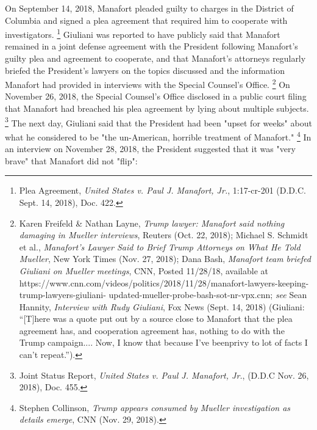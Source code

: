 On September 14, 2018, Manafort pleaded guilty to charges in the District of Columbia and signed a plea agreement that required him to cooperate with investigators.%
\footnote{Plea Agreement, \textit{United States v. Paul J. Manafort, Jr.}, 1:17-cr-201 (D.D.C. Sept. 14, 2018), Doc. 422.}
Giuliani was reported to have publicly said that Manafort remained in a joint defense agreement with the President following Manafort's guilty plea and agreement to cooperate, and that Manafort's attorneys regularly briefed the President's lawyers on the topics discussed and the information Manafort had provided in interviews with the Special Counsel's Office.%
\footnote{Karen Freifeld \& Nathan Layne, \textit{Trump lawyer: Manafort said nothing damaging in Mueller interviews}, Reuters (Oct. 22, 2018);
Michael S. Schmidt et al., \textit{Manafort’s Lawyer Said to Brief Trump Attorneys on What He Told Mueller}, New York Times (Nov. 27, 2018);
Dana Bash, \textit{Manafort team briefed Giuliani on Mueller meetings}, CNN, Posted 11/28/18, available at
https://www.cnn.com/videos/politics/2018/11/28/manafort-lawyers-keeping-trump-lawyers-giuliani- updated-mueller-probe-bash-sot-nr-vpx.cnn;
\textit{see} Sean Hannity, \textit{Interview with Rudy Giuliani}, Fox News (Sept. 14, 2018) (Giuliani: “[T]here was a quote put out by a source close to Manafort that the plea agreement has, and cooperation agreement has, nothing to do with the Trump campaign....
Now, I know that because I’ve beenprivy to lot of facts I can’t repeat.”).}
On November 26, 2018, the Special Counsel's Office disclosed in a public court filing that Manafort had breached his plea agreement by lying about multiple subjects.%
\footnote{Joint Status Report, \textit{United States v. Paul J. Manafort, Jr.}, (D.D.C Nov. 26, 2018), Doc. 455.}
The next day, Giuliani said that the President had been "upset for weeks" about what he considered to be "the un-American, horrible treatment of Manafort."%
\footnote{Stephen Collinson, \textit{Trump appears consumed by Mueller investigation as details emerge}, CNN (Nov. 29, 2018).}
In an interview on November 28, 2018, the President suggested that it was "very brave" that Manafort did not "flip":

